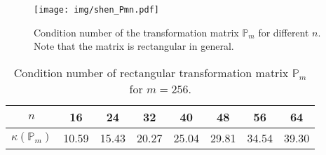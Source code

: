 \documentclass[a4paper,10pt]{article}
\newcommand{\Mmmat}{\ensuremath{\mathbb{M}_m}}               %
\newcommand{\Pmat}{\ensuremath{\mathbb{P}_m}}                  %
\newcommand{\Pmatt}{\ensuremath{\mathbb{P}_m^{\text{T}}}}       %
\newcommand{\TODO}[1]{\textcolor{red}{#1}}
\newcommand{\ASK}[1]{\textcolor{blue}{#1}}
\begin{document}
% 
%   
%   
  \begin{figure}
  \begin{center}
    \texttt{[image: img/shen\_Pmn.pdf]}
  \end{center}
  \label{fig:shen_P}
  \caption{Condition number of the transformation matrix $\Pmat$ for different $n$.
    Note that the matrix is rectangular in general.}
  \end{figure}

  \begin{table}
    \begin{center}
    \begin{tabular}{|c||c|c|c|c|c|c|c|}
      \hline
      $n$           & 16 & 24 & 32 & 40 & 48 & 56 & 64\\
      \hline\hline
      $\kappa\left(\Pmat\right)$ & 10.59 & 15.43 & 20.27 & 25.04 & 29.81 & 34.54 & 39.30 \\
      \hline
    \end{tabular}
  \caption{Condition number of rectangular transformation matrix $\Pmat$ for
  $m=256$.}
  \label{tab:shen_Pm}
  \end{center}
  \end{table}
\end{document}
